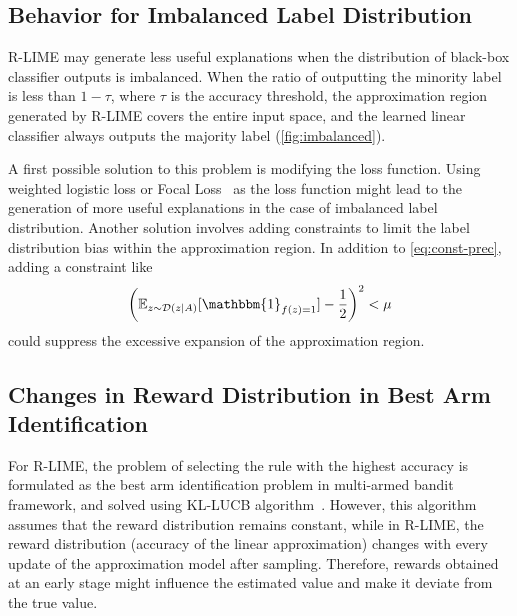 \documentclass[runningheads]{llncs}
\begin{document}
{\subsection{Behavior for Imbalanced Label Distribution}
R-LIME may generate less useful explanations
when the distribution of black-box classifier outputs is imbalanced.
When the ratio of outputting the minority label is less than $1-\tau$,
where $\tau$ is the accuracy threshold,
the approximation region generated by R-LIME covers the entire input space,
and the learned linear classifier always outputs the majority label
(\cref{fig:imbalanced}).

A first possible solution to this problem is modifying the loss function.
Using weighted logistic loss or Focal Loss~\cite{lin2020focal}
as the loss function might lead to the generation of more useful explanations
in the case of imbalanced label distribution.
Another solution involves adding constraints
to limit the label distribution bias within the approximation region.
In addition to \cref{eq:const-prec}, adding a constraint like
\begin{equation}
  {%
    \left(
    \mathbb{E}_{z\sim\mathcal{D}(z\mid A)}[\mathbbm{1}_{f(z)=1}]-\frac{1}{2}
    \right)
  }^2<\mu
\end{equation}
could suppress the excessive expansion of the approximation region.

\subsection{Changes in Reward Distribution in Best Arm Identification}\label{sec:reward}
{%
  \renewcommand{\arraystretch}{1.1}
  \begin{table}[tbp]
    \centering
    \caption[Deviation between the estimated accuracy and the true accuracy]{%
      Deviation between the estimated accuracy and the true accuracy
      of the linear classifier learned by R-LIME\@.
      The deviation $0.012\pm0.017$ was relatively small
      considering the confidence level $1-\delta=0.95$.
    }\label{tab:reward}
    
  \end{table}
}
For R-LIME,
the problem of selecting the rule with the highest accuracy is formulated
as the best arm identification problem in multi-armed bandit framework,
and solved using KL-LUCB algorithm~\cite{kaufmann2013information}.
However, this algorithm assumes that the reward distribution remains constant,
while in R-LIME,
the reward distribution (accuracy of the linear approximation)
changes with every update of the approximation model after sampling.
Therefore, rewards obtained at an early stage
might influence the estimated value and
make it deviate from the true value.

}
\end{document}
